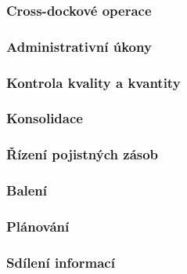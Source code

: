 \subsubsection*{Cross-dockové operace}


\subsubsection*{Administrativní úkony}

\subsubsection*{Kontrola kvality a kvantity}

\subsubsection*{Konsolidace}

\subsubsection*{Řízení pojistných zásob}

\subsubsection*{Balení}

\subsubsection*{Plánování}

\subsubsection*{Sdílení informací}
 
